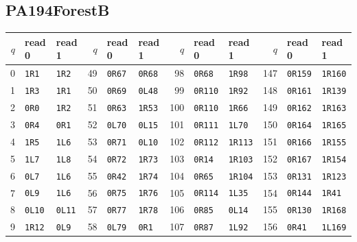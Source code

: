 \subsection{PA194ForestB}
\begin{center}\fontsize{8.5}{9.3}\selectfont
\setlength{\tabcolsep}{5pt}\renewcommand{\arraystretch}{1.03}
\begin{tabular}{rll@{\hspace{12pt}}rll@{\hspace{12pt}}rll@{\hspace{12pt}}rll}
\toprule
$q$ & read 0 & read 1 & $q$ & read 0 & read 1 & $q$ & read 0 & read 1 & $q$ & read 0 & read 1\\\midrule
0 & \texttt{1R1} & \texttt{1R2} & 49 & \texttt{0R67} & \texttt{0R68} & 98 & \texttt{0R68} & \texttt{1R98} & 147 & \texttt{0R159} & \texttt{1R160}\\
1 & \texttt{1R3} & \texttt{1R1} & 50 & \texttt{0R69} & \texttt{0L48} & 99 & \texttt{0R110} & \texttt{1R92} & 148 & \texttt{0R161} & \texttt{1R139}\\
2 & \texttt{0R0} & \texttt{1R2} & 51 & \texttt{0R63} & \texttt{1R53} & 100 & \texttt{0R110} & \texttt{1R66} & 149 & \texttt{0R162} & \texttt{1R163}\\
3 & \texttt{0R4} & \texttt{0R1} & 52 & \texttt{0L70} & \texttt{0L15} & 101 & \texttt{0R111} & \texttt{1L70} & 150 & \texttt{0R164} & \texttt{1R165}\\
4 & \texttt{1R5} & \texttt{1L6} & 53 & \texttt{0R71} & \texttt{0L10} & 102 & \texttt{0R112} & \texttt{1R113} & 151 & \texttt{0R166} & \texttt{1R155}\\
5 & \texttt{1L7} & \texttt{1L8} & 54 & \texttt{0R72} & \texttt{1R73} & 103 & \texttt{0R14} & \texttt{1R103} & 152 & \texttt{0R167} & \texttt{1R154}\\
6 & \texttt{0L7} & \texttt{1L6} & 55 & \texttt{0R42} & \texttt{1R74} & 104 & \texttt{0R65} & \texttt{1R104} & 153 & \texttt{0R131} & \texttt{1R123}\\
7 & \texttt{0L9} & \texttt{1L6} & 56 & \texttt{0R75} & \texttt{1R76} & 105 & \texttt{0R114} & \texttt{1L35} & 154 & \texttt{0R144} & \texttt{1R41}\\
8 & \texttt{0L10} & \texttt{0L11} & 57 & \texttt{0R77} & \texttt{1R78} & 106 & \texttt{0R85} & \texttt{0L14} & 155 & \texttt{0R130} & \texttt{1R168}\\
9 & \texttt{1R12} & \texttt{0L9} & 58 & \texttt{0L79} & \texttt{0R1} & 107 & \texttt{0R87} & \texttt{1L92} & 156 & \texttt{0R41} & \texttt{1L169}\\

\end{tabular}
\end{center}
